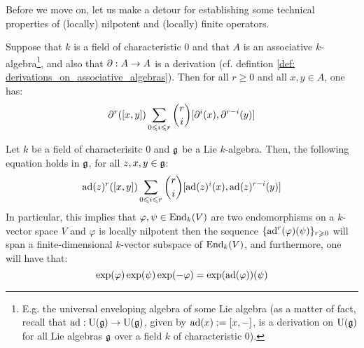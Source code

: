             Before we move on, let us make a detour for establishing some technical properties of (locally) nilpotent and (locally) finite operators.
            \begin{lemma} \label{lemma: actions_of_derivations_on_lie_brackets}
                \cite[Lemma 5.1.2(i)]{perrin_kac_moody_algebras} Suppose that $k$ is a field of characteristic $0$ and that $A$ is an associative $k$-algebra\footnote{E.g. the universal enveloping algebra of some Lie algebra (as a matter of fact, recall that $\mathrm{ad}: \mathrm{U}(\mathfrak{g}) \to \mathrm{U}(\mathfrak{g})$, given by $\mathrm{ad}(x) := [x, -]$, is a derivation on $\mathrm{U}(\mathfrak{g})$ for all Lie algebras $\mathfrak{g}$ over a field $k$ of characteristic $0$).}, and also that $\partial: A \to A$ is a derivation (cf. defintion \ref{def: derivations_on_associative_algebras}). Then for all $r \geq 0$ and all $x, y \in A$, one has:
                    $$\partial^r([x, y]) \sum_{0 \leqslant i \leqslant r} \binom{r}{i} [\partial^i(x), \partial^{r - i}(y)]$$
            \end{lemma}
            \begin{corollary} \label{coro: derivative_of_conjugation_is_adjunction}
                \cite[Lemma 5.1.2(ii) and Corollary 5.1.3]{perrin_kac_moody_algebras} Let $k$ be a field of characterisitc $0$ and $\mathfrak{g}$ be a Lie $k$-algebra. Then, the following equation holds in $\mathfrak{g}$, for all $z, x, y \in \mathfrak{g}$:
                    $$\mathrm{ad}(z)^r([x, y]) \sum_{0 \leqslant i \leqslant r} \binom{r}{i} [\mathrm{ad}(z)^i(x), \mathrm{ad}(z)^{r - i}(y)]$$
                In particular, this implies that $\varphi, \psi \in \mathrm{End}_k(V)$ are two endomorphisms on a $k$-vector space $V$ and $\varphi$ is locally nilpotent then the sequence $\{\mathrm{ad}^r(\varphi)(\psi)\}_{r \geqslant 0}$ will span a finite-dimensional $k$-vector subspace of $\mathrm{End}_k(V)$, and furthermore, one will have that:
                    $$\exp(\varphi) \exp(\psi) \exp(-\varphi) = \exp(\mathrm{ad}(\varphi))(\psi)$$
            \end{corollary}
            
